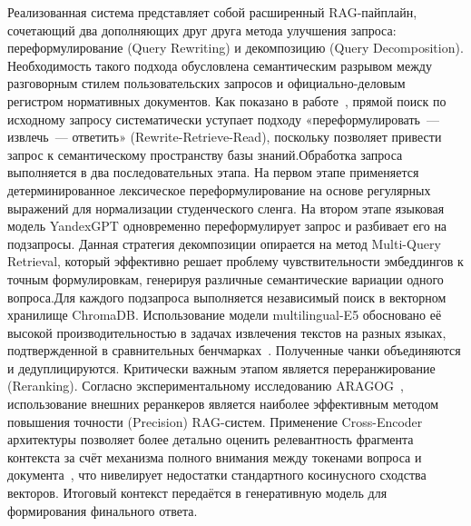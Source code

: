 \documentclass{article}
\begin{document}
\noindent Реализованная система представляет собой расширенный RAG-пайплайн,
сочетающий два дополняющих друг друга метода улучшения запроса: переформулирование (Query Rewriting) и декомпозицию (Query Decomposition). Необходимость такого подхода обусловлена семантическим разрывом между разговорным стилем пользовательских запросов и официально-деловым регистром нормативных документов. Как показано в работе~\cite{2}, прямой поиск по исходному запросу систематически уступает подходу «переформулировать~--- извлечь~--- ответить» (Rewrite-Retrieve-Read), поскольку позволяет привести запрос к семантическому пространству базы знаний.Обработка запроса выполняется в два последовательных этапа. На первом этапе применяется детерминированное лексическое переформулирование на основе регулярных выражений для нормализации студенческого сленга. На втором этапе языковая модель YandexGPT одновременно переформулирует запрос и разбивает его на подзапросы. Данная стратегия декомпозиции опирается на метод Multi-Query Retrieval, который эффективно решает проблему чувствительности эмбеддингов к точным формулировкам, генерируя различные семантические вариации одного вопроса.Для каждого подзапроса выполняется независимый поиск в векторном хранилище ChromaDB. Использование модели \mbox{multilingual-E5} обосновано её высокой производительностью в задачах извлечения текстов на разных языках, подтвержденной в сравнительных бенчмарках~\cite{4}. Полученные чанки объединяются и дедуплицируются. Критически важным этапом является переранжирование (Reranking). Согласно экспериментальному исследованию ARAGOG~\cite{5}, использование внешних реранкеров является наиболее эффективным методом повышения точности (Precision) RAG-систем. Применение Cross-Encoder архитектуры позволяет более детально оценить релевантность фрагмента контекста за счёт механизма полного внимания между токенами вопроса и документа~\cite{6}, что нивелирует недостатки стандартного косинусного сходства векторов. Итоговый контекст передаётся в генеративную модель для формирования финального ответа.


\bigskip
\bigskip
\end{document}
